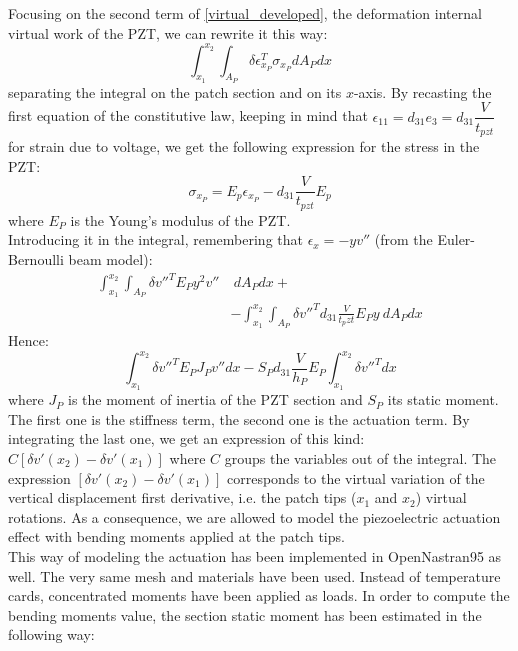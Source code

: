 \documentclass[twocolumn,a4paper,10pt,english]{article}
\begin{document}
	    Focusing on the second term of \eqref{virtual_developed}, the deformation internal virtual work of the PZT, we can rewrite it this way:
	    \begin{equation}
	    \int_{x_1}^{x_2}\int_{A_P}\delta\epsilon_{x_P}^T\sigma_{x_P} dA_P dx
	    \end{equation}
	    separating the integral on the patch section and on its $x$-axis.
	    By recasting the first equation of the constitutive law, keeping in mind that $\epsilon_{11}=d_{31}e_3=d_{31}\dfrac{V}{t_{pzt}}$ for strain due to voltage, we get the following expression for the stress in the PZT:
	    \begin{equation}
	    \sigma_{x_P}=E_p\epsilon_{x_P}-d_{31}\frac{V}{t_{pzt}}E_p
	    \end{equation}
	    where $E_P$ is the Young's modulus of the PZT.\\
	    Introducing it in the integral, remembering that $\epsilon_x=-yv''$ (from the Euler-Bernoulli beam model):
	    \begin{equation}\begin{split}
	    \int_{x_1}^{x_2}\int_{A_P}\delta v''^T E_P y^2 v''& ~dA_P dx+\\
	    &-\int_{x_1}^{x_2}\int_{A_P}\delta v''^T d_{31}\frac{V}{t_pzt} E_P y ~dA_P dx
	    \end{split}\end{equation}
	    Hence:
	    \begin{equation}
	    \int_{x_1}^{x_2}\delta v''^T E_P J_P v'' dx-S_Pd_{31}\frac{V}{h_P} E_P\int_{x_1}^{x_2}\delta v''^T dx
	    \end{equation}
	    where $J_P$ is the moment of inertia of the PZT section and $S_P$ its static moment. The first one is the stiffness term, the second one is the actuation term. By integrating the last one, we get an expression of this kind: $C[\delta v'(x_2)-\delta v'(x_1)]$ where $C$ groups the variables out of the integral. The expression $[\delta v'(x_2)-\delta v'(x_1)]$ corresponds  to the virtual variation of the vertical displacement first derivative, i.e. the patch tips ($x_1$ and $x_2$) virtual rotations. As a consequence, we are allowed to model the piezoelectric actuation effect with bending moments applied at the patch tips.\\
	    This way of modeling the actuation has been implemented in OpenNastran95 as well. The very same mesh and materials have been used. Instead of temperature cards, concentrated moments have been applied as loads. In order to compute the bending moments value, the section static moment has been estimated in the following way:
\end{document}
